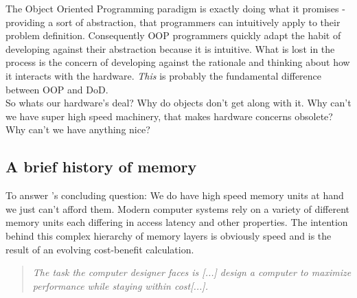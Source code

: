 The Object Oriented Programming paradigm is exactly doing what it promises - providing a sort of abstraction, that programmers can intuitively apply to their problem definition. Consequently OOP programmers quickly adapt the habit of developing against their abstraction because it is intuitive. What is lost in the process is the concern of developing against the rationale and thinking about how it interacts with the hardware. \textit{This} is probably the fundamental difference between OOP and DoD.\\
So whats our hardware's deal? Why do objects don't get along with it. Why can't we have super high speed machinery, that makes hardware concerns obsolete? Why can't we have anything nice?

\subsection{A brief history of memory}
To answer 's concluding question: We do have high speed memory units at hand we just can't afford them. Modern computer systems rely on a variety of different memory units each differing in access latency and other properties. The intention behind this complex hierarchy of memory layers is obviously speed and is the result of an evolving cost-benefit calculation.
\begin{quote}
	\textit{The task the computer designer faces is [...] design a computer to maximize
		performance while staying within cost[...].}
\end{quote}

